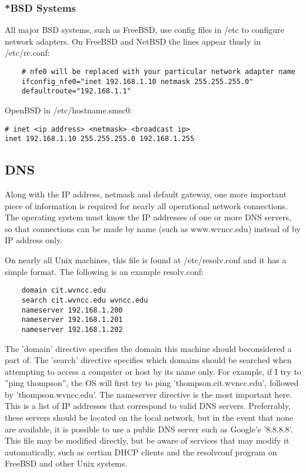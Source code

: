 \subsubsection{*BSD Systems}

All major BSD systems, such as FreeBSD, use config files in /etc to configure network adapters.  On FreeBSD and NetBSD the lines appear thusly in /etc/rc.conf:

\begin{verbatim}
    # nfe0 will be replaced with your particular network adapter name
    ifconfig_nfe0="inet 192.168.1.10 netmask 255.255.255.0"
    defaultroute="192.168.1.1"
\end{verbatim}

OpenBSD in /etc/hostname.smsc0: 

\begin{verbatim}
# inet <ip address> <netmask> <broadcast ip>
inet 192.168.1.10 255.255.255.0 192.168.1.255
\end{verbatim}

\subsection{DNS}

Along with the IP address, netmask and default gateway, one more important piece of information is required for nearly all operational network connections.  The operating system must know the IP addresses of one or more DNS servers, so that connections can be made by name (such as www.wvncc.edu) instead of by IP address only. 

On nearly all Unix machines, this file is found at /etc/resolv.conf and it has a simple format. The following is an example resolv.conf:

\begin{verbatim}
    domain cit.wvncc.edu
    search cit.wvncc.edu wvncc.edu
    nameserver 192.168.1.200
    nameserver 192.168.1.201
    nameserver 192.168.1.202
\end{verbatim}

The ’domain’ directive specifies the domain this machine should beconsidered a part of. The ’search’ directive specifies which domains should be searched when attempting to access a computer or host by its name only. For example, if I try to ”ping thompson”, the OS will first try to ping ’thompson.cit.wvncc.edu’, followed by ’thompson.wvncc.edu’. The nameserver directive is the most important here. This is a list of IP addresses that correspond to valid DNS servers. Preferrably, these servers should be located on the local network, but in the event that none are available, it is possible to use a public DNS server such as Google’s ’8.8.8.8’. This file may be modified directly, but be aware of services that may modify it automatically, such as certian DHCP clients and the resolvconf program on FreeBSD and other Unix systems.

